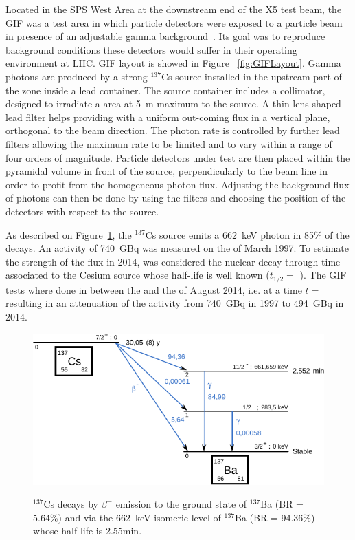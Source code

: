 	Located in the SPS West Area at the downstream end of the X5 test beam, the \acf{GIF} was a test area in which particle detectors were exposed to a particle beam in presence of an adjustable gamma background~\cite{AGOSTEO1999}. Its goal was to reproduce background conditions these detectors would suffer in their operating environment at LHC. GIF layout is showed in Figure ~\ref{fig:GIFLayout}. Gamma photons are produced by a strong $^{137}$Cs source installed in the upstream part of the zone inside a lead container. The source container includes a collimator, designed to irradiate a  area at \SI{5}{m} maximum to the source. A thin lens-shaped lead filter helps providing with a uniform out-coming flux in a vertical plane, orthogonal to the beam direction. The photon rate is controlled by further lead filters allowing the maximum rate to be limited and to vary within a range of four orders of magnitude. Particle detectors under test are then placed within the pyramidal volume in front of the source, perpendicularly to the beam line in order to profit from the homogeneous photon flux. Adjusting the background flux of photons can then be done by using the filters and choosing the position of the detectors with respect to the source.
			
	As described on Figure~\ref{fig:CsSource}, the $^{137}$Cs source emits a \SI{662}{keV} photon in 85\% of the decays. An activity of \SI{740}{GBq} was measured on the  of March 1997. To estimate the strength of the flux in 2014, was considered the nuclear decay through time associated to the Cesium source whose half-life is well known ($t_{1/2}=$ ). The GIF tests where done in between the  and the  of August 2014, i.e. at a time $t=$  resulting in an attenuation of the activity from \SI{740}{GBq} in 1997 to \SI{494}{GBq} in 2014.

	\begin{figure}[H]
		\centering
		\includegraphics[width = 0.8\plotwidth]{fig/chapt5/Cs137.pdf}\\
		\caption{\label{fig:CsSource} $^{137}$Cs decays by $\beta^-$ emission to the ground state of $^{137}$Ba (BR = 5.64\%) and via the \SI{662}{keV} isomeric level of $^{137}$Ba (BR = 94.36\%) whose half-life is 2.55min.}
	\end{figure}
		
